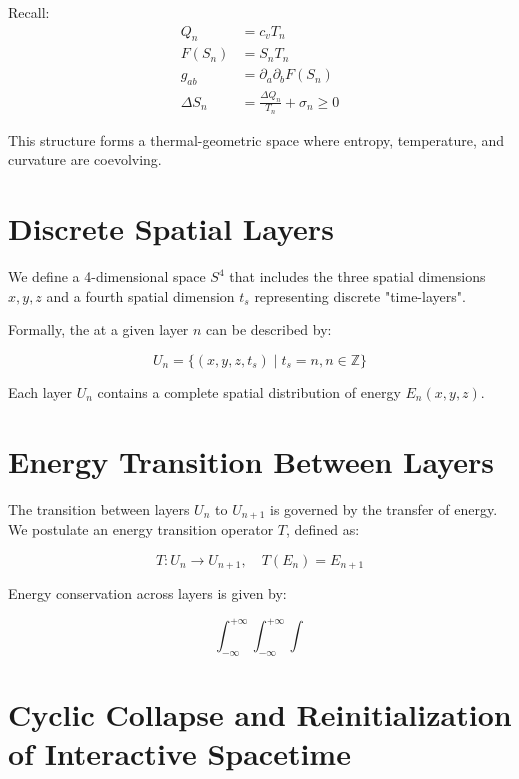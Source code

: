 \documentclass[11pt]{article}
\begin{document}
Recall:
\begin{align*}
Q_n &= c_v T_n \\
F(S_n) &= S_n T_n \\
g_{ab} &= \partial_a \partial_b F(S_n) \\
\Delta S_n &= \frac{\Delta Q_n}{T_n} + \sigma_n \geq 0
\end{align*}

This structure forms a thermal-geometric space where entropy, temperature, and curvature are coevolving.

\section{Discrete Spatial Layers}
We define a 4-dimensional space \( S^4 \) that includes the three spatial dimensions \( x, y, z \) and a fourth spatial dimension \( t_s \) representing discrete "time-layers".

Formally, the 
at a given layer \( n \) can be described by:

\begin{equation}
U_n = \{ (x, y, z, t_s) \mid t_s = n, n \in \mathbb{Z} \}
\end{equation}

Each layer \(U_n\) contains a complete spatial distribution of energy \(E_n(x, y, z)\).

\section{Energy Transition Between Layers}

The transition between layers \( U_n \) to \( U_{n+1} \) is governed by the transfer of energy. We postulate an energy transition operator \(T\), defined as:

\begin{equation}
T: U_n \rightarrow U_{n+1}, \quad T(E_n) = E_{n+1}
\end{equation}

Energy conservation across layers is given by:

\begin{equation}
\int_{-\infty}^{+\infty}\int_{-\infty}^{+\infty}\int
\end{equation}

\section{Cyclic Collapse and Reinitialization of Interactive Spacetime}
\end{document}
